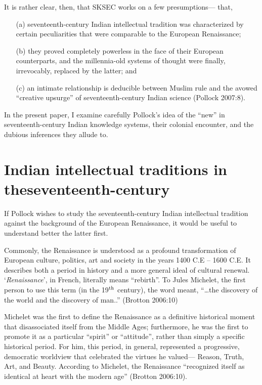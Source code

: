 It is rather clear, then, that SKSEC works on a few presumptions— that, 
\begin{itemize}
\itemsep=0pt
\item[(a)] seventeenth-century Indian intellectual tradition was characterized by certain peculiarities that were comparable to the European Renaissance;

\item[(b)] they proved completely powerless in the face of their European counterparts, and the millennia-old systems of thought were finally, irrevocably, replaced by the latter; and

\item[(c)] an intimate relationship is deducible between Muslim rule and the avowed “creative upsurge” of seventeenth-century Indian science (Pollock 2007:8).
\end{itemize}

In the present paper, I examine carefully Pollock’s idea of the “new” in seventeenth-century Indian knowledge systems, their colonial encounter, and the dubious inferences they allude to.\\[-21pt]

\section{Indian intellectual traditions in the\newline seventeenth-century}

If Pollock wishes to study the seventeenth-century Indian intellectual tradition against the background of the European Renaissance, it would be useful to understand better the latter first. 

Commonly, the Renaissance is understood as a profound transformation of European culture, politics, art and society in the years 1400 C.E – 1600 C.E.  It describes both a period in history and a more general ideal of cultural renewal. ‘{\em Renaissance}’, in French, literally means “rebirth”. To Jules Michelet, the first person to use this term (in the 19$^{\rm th}$ century), the word meant, “…the discovery of the world and the discovery of man..” (Brotton 2006:10) 

Michelet was the first to define the Renaissance as a definitive historical moment that disassociated itself from the Middle Ages; furthermore, he was the first to promote it as a particular “spirit” or “attitude”, rather than simply a specific historical period. For him, this period, in general, represented a progressive, democratic worldview that celebrated the virtues he valued— Reason, Truth, Art, and Beauty. According to Michelet, the Renaissance “recognized itself as identical at heart with the modern age” (Brotton 2006:10).

